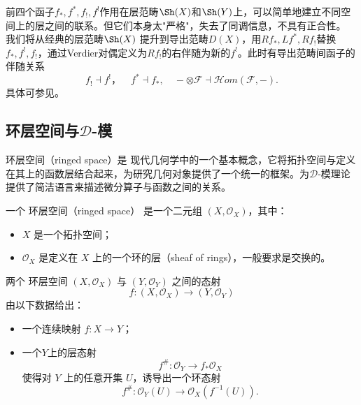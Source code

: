 前四个函子$f_*,f^*,f_!,f^!$作用在层范畴$\Sh(X)$和$\Sh(Y)$上，可以简单地建立不同空间上的层之间的联系。但它们本身太"严格"，失去了同调信息，不具有正合性。
我们将从经典的层范畴$\Sh(X)$ 提升到导出范畴$D(X)$，用$Rf_*, Lf^*, Rf_!$替换$f_*,f^!,f_!$，通过Verdier对偶定义为$Rf_!$的右伴随为新的$f^!$。此时有导出范畴间函子的伴随关系
\begin{equation*}
    f_! \dashv f^!，\quad f^* \dashv f_*,\quad -\otimes  \mathcal{F}\dashv \mathcal{H}om(\mathcal{F},-).
\end{equation*}
具体可参见\cite{gallauer2021introduction}。




\subsection{环层空间与$\mathcal{D}$-模}
环层空间（ringed space）是 现代几何学中的一个基本概念，它将拓扑空间与定义在其上的函数层结合起来，为研究几何对象提供了一个统一的框架。为$\mathcal{D}$-模理论提供了简洁语言来描述微分算子与函数之间的关系。


\begin{definition}
    一个 环层空间（ringed space） 是一个二元组 $(X,\mathcal{O}_X)$，其中：
    \begin{itemize}
        \item $X$ 是一个拓扑空间；
        \item $\mathcal{O}_X$ 是定义在 $X$ 上的一个环的层（sheaf of rings），一般要求是交换的。
    \end{itemize}
\end{definition}


\begin{definition}
    两个 环层空间 $(X,\mathcal{O}_X)$ 与 $(Y,\mathcal{O}_Y)$ 之间的态射
    \begin{equation*}
        f: (X,\mathcal{O}_X) \to (Y,\mathcal{O}_Y)
    \end{equation*}
    由以下数据给出：
    \begin{itemize}
        \item 一个连续映射 $f: X \to Y$；
        \item 一个$Y$上的层态射
              \[
                  f^\#: \mathcal{O}_Y \to f_* \mathcal{O}_X
              \]
              使得对 $Y$ 上的任意开集 $U$，诱导出一个环态射
              \[
                  f^\#: \mathcal{O}_Y(U) \to \mathcal{O}_X(f^{-1}(U)).
              \]
    \end{itemize}
\end{definition}

